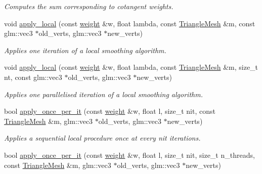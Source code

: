\begin{DoxyCompactItemize}
\begin{DoxyCompactList}\small\item\em Computes the sum corresponding to cotangent weights. \end{DoxyCompactList}\item 
void \hyperlink{namespacegeoproc_1_1smoothing_1_1local__private_a233a9fc9782e2064cbd1c7006485a865}{apply\+\_\+local} (const \hyperlink{namespacegeoproc_a12e5a10581b53b9dd9a509127527f843}{weight} \&w, float lambda, const \hyperlink{classgeoproc_1_1TriangleMesh}{Triangle\+Mesh} \&m, const glm\+::vec3 $\ast$old\+\_\+verts, glm\+::vec3 $\ast$new\+\_\+verts)
\begin{DoxyCompactList}\small\item\em Applies one iteration of a local smoothing algorithm. \end{DoxyCompactList}\item 
void \hyperlink{namespacegeoproc_1_1smoothing_1_1local__private_a20ed9aea1e6c471bdec5608e19bb73bd}{apply\+\_\+local} (const \hyperlink{namespacegeoproc_a12e5a10581b53b9dd9a509127527f843}{weight} \&w, float lambda, const \hyperlink{classgeoproc_1_1TriangleMesh}{Triangle\+Mesh} \&m, size\+\_\+t nt, const glm\+::vec3 $\ast$old\+\_\+verts, glm\+::vec3 $\ast$new\+\_\+verts)
\begin{DoxyCompactList}\small\item\em Applies one parallelised iteration of a local smoothing algorithm. \end{DoxyCompactList}\item 
bool \hyperlink{namespacegeoproc_1_1smoothing_1_1local__private_a2f0145cf84135b79813338e5cd18ab87}{apply\+\_\+once\+\_\+per\+\_\+it} (const \hyperlink{namespacegeoproc_a12e5a10581b53b9dd9a509127527f843}{weight} \&w, float l, size\+\_\+t nit, const \hyperlink{classgeoproc_1_1TriangleMesh}{Triangle\+Mesh} \&m, glm\+::vec3 $\ast$old\+\_\+verts, glm\+::vec3 $\ast$new\+\_\+verts)
\begin{DoxyCompactList}\small\item\em Applies a sequential local procedure once at every {\itshape nit} iterations. \end{DoxyCompactList}\item 
bool \hyperlink{namespacegeoproc_1_1smoothing_1_1local__private_a02e50268720d1728f61cf280998d4b0e}{apply\+\_\+once\+\_\+per\+\_\+it} (const \hyperlink{namespacegeoproc_a12e5a10581b53b9dd9a509127527f843}{weight} \&w, float l, size\+\_\+t nit, size\+\_\+t n\+\_\+threads, const \hyperlink{classgeoproc_1_1TriangleMesh}{Triangle\+Mesh} \&m, glm\+::vec3 $\ast$old\+\_\+verts, glm\+::vec3 $\ast$new\+\_\+verts)

\end{DoxyCompactItemize}
